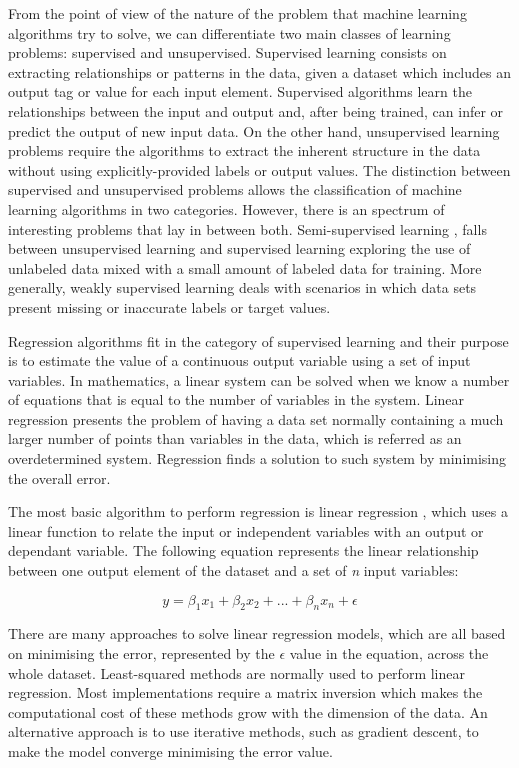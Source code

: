 From the point of view of the nature of the problem that machine learning algorithms try to solve, we can differentiate two main classes of learning problems: supervised and unsupervised. Supervised learning \citep{russell2016artificial} consists on extracting relationships or patterns in the data, given a dataset which includes an output tag or value for each input element. Supervised algorithms learn the relationships between the input and output and, after being trained, can infer or predict the output of new input data. On the other hand, unsupervised learning problems \citep{hastie2009unsupervised} require the algorithms to extract the inherent structure in the data without using explicitly-provided labels or output values. The distinction between supervised and unsupervised problems allows the classification of machine learning algorithms in two categories. However, there is an spectrum of interesting problems that lay in between both. Semi-supervised learning \citep{chapelle2009semi}, falls between unsupervised learning and supervised learning exploring the use of unlabeled data mixed with a small amount of labeled data for training. More generally, weakly supervised learning \citep{hernandez2016weak} deals with scenarios in which data sets present missing or inaccurate labels or target values. 

\medskip

Regression algorithms fit in the category of supervised learning and their purpose is to estimate the value of a continuous output variable using a set of input variables. In mathematics, a linear system can be solved when we know a number of equations that is equal to the number of variables in the system. Linear regression presents the problem of having a data set normally containing a much larger number of points than variables in the data, which is referred as an overdetermined system. Regression finds a solution to such system by minimising the overall error.

\medskip

The most basic algorithm to perform regression is linear regression \citep{neter1989applied}, which uses a linear function to relate the input or independent variables with an output or dependant variable. The following equation represents the linear relationship between one output element of the dataset and a set of \textit{n} input variables:

\[ y = \beta_1 x_{1} + \beta_2 x_{2} + ... + \beta_n x_{n} + \epsilon \]

There are many approaches to solve linear regression models, which are all based on minimising the error, represented by the $\epsilon$ value in the equation, across the whole dataset.  Least-squared methods are normally used to perform linear regression. Most implementations require a matrix inversion which makes the computational cost of these methods grow with the dimension of the data. An alternative approach is to use iterative methods, such as gradient descent, to make the model converge minimising the error value. 

